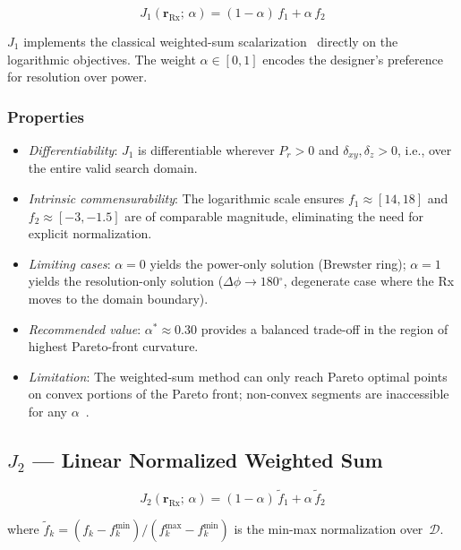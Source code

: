 \documentclass[journal]{IEEEtran}
\newcommand{\Rx}{\mathrm{Rx}}
\newcommand{\rRx}{\mathbf{r}_{\Rx}}
\newcommand{\dxy}{\delta_{xy}}
\newcommand{\dz}{\delta_z}
\newcommand{\gdeg}{\ensuremath{^{\circ}}}
\begin{document}
\begin{equation}
  \boxed{J_1(\rRx;\,\alpha) = (1-\alpha)\,f_1 + \alpha\,f_2}
  \label{eq:J1}
\end{equation}

$J_1$ implements the classical weighted-sum scalarization~\cite{zadeh1963}
directly on the logarithmic objectives. The weight $\alpha \in [0,1]$ encodes
the designer's preference for resolution over power.

\subsubsection*{Properties}
\begin{itemize}
  \item \emph{Differentiability}: $J_1$ is differentiable wherever $P_r > 0$
    and $\dxy, \dz > 0$, i.e., over the entire valid search domain.
  \item \emph{Intrinsic commensurability}: The logarithmic scale ensures
    $f_1 \approx [14,18]$ and $f_2 \approx [-3,-1.5]$ are of comparable
    magnitude, eliminating the need for explicit normalization.
  \item \emph{Limiting cases}: $\alpha = 0$ yields the power-only solution
    (Brewster ring); $\alpha = 1$ yields the resolution-only solution
    ($\Delta\phi \to 180\gdeg$, degenerate case where the Rx moves to the
    domain boundary).
  \item \emph{Recommended value}: $\alpha^* \approx 0.30$ provides a balanced
    trade-off in the region of highest Pareto-front curvature.
  \item \emph{Limitation}: The weighted-sum method can only reach Pareto
    optimal points on convex portions of the Pareto front; non-convex segments
    are inaccessible for any $\alpha$~\cite{das1997}.
\end{itemize}

\subsection{\texorpdfstring{$J_2$}{J2} — Linear Normalized Weighted Sum}

\begin{equation}
  J_2(\rRx;\,\alpha) = (1-\alpha)\,\tilde{f}_1 + \alpha\,\tilde{f}_2
  \label{eq:J2}
\end{equation}

where $\tilde{f}_k = (f_k - f_k^{\min}) / (f_k^{\max} - f_k^{\min})$ is the
min-max normalization over~$\mathcal{D}$.
\end{document}
